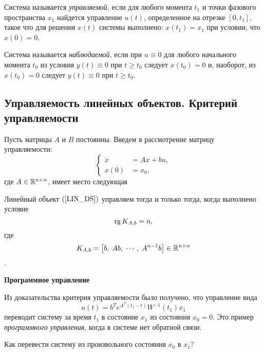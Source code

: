 \documentclass[../../TAU.tex]{subfiles}
\begin{document}
    \begin{defi}
        Система  называется {\it управляемой}, если для любого момента $t_1$ и точки фазового пространства $x_1$ найдется управление $u(t)$, определенное на отрезке $[0,t_1]$, такое что для решения $x(t)$ системы  выполнено: $x(t_1) = x_1$ при условии, что $x(0)=0$.
    \end{defi}

    \begin{defi}
        Система  называется {\it наблюдаемой}, если при $u\equiv0$ для любого начального момента $t_0$ из условия $y(t)\equiv 0$ при $t\ge t_0$ следует $x(t_0) = 0$ и, наоборот, из $x(t_0)=0$ следует $y(t)\equiv0$ при $t\ge t_0$.
    \end{defi}

\subsection{Управляемость линейных объектов. Критерий управляемости}

    Пусть матрицы $A$ и $B$ постоянны. Введем в рассмотрение матрицу управляемости:
    \begin{equation}\label{LIN_DS}
        \left\{
        \begin{aligned}
            \dot x &= Ax + bu,\\
            x(0) &= x_0,
        \end{aligned}
        \right.
    \end{equation}
    где $A\in\mathbb{R}^{n\times n}$, имеет место следующая
    \begin{theor}
        Линейный объект $\eref{LIN_DS}$ управляем тогда и только тогда, когда выполнено условие 
        $$
            \mathop{\mathrm{rg}}\nolimits K_{A,b} = n,
        $$
        где
        $$
            K_{A,b} = \left[b,\; Ab,\; \cdots,\; A^{n-1}b\right]\in\mathbb{R}^{n\times n}
        $$.
    \end{theor}

    \proof \cite[стр. 305]{voron2}
    \par
    \textbf{Программное управление}
    \par
    Из доказательства критерия управляемости было получено, что управление вида
    $$
        u(t) = b^Te^{A^T(t_1-t)}W^{-1}(t_1)x_1
    $$
    переводит систему за время $t_1$ в состояние $x_1$ из состояния $x_0 = 0$. Это пример {\it программного управления}, когда в системе нет обратной связи.

    Как перевести систему из произвольного состояния $x_0$ в $x_1$?
\end{document}
